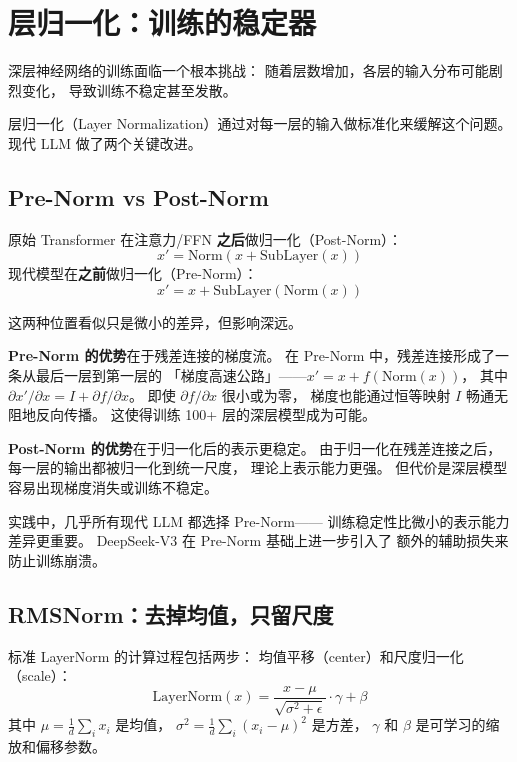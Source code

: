 \section{层归一化：训练的稳定器}

深层神经网络的训练面临一个根本挑战：
随着层数增加，各层的输入分布可能剧烈变化，
导致训练不稳定甚至发散。

层归一化（Layer Normalization）通过对每一层的输入做标准化来缓解这个问题。
现代 LLM 做了两个关键改进。

\subsection{Pre-Norm vs Post-Norm}

原始 Transformer 在注意力/FFN \textbf{之后}做归一化（Post-Norm）：
\[
  x' = \mathrm{Norm}(x + \mathrm{SubLayer}(x))
\]
现代模型在\textbf{之前}做归一化（Pre-Norm）：
\[
  x' = x + \mathrm{SubLayer}(\mathrm{Norm}(x))
\]

这两种位置看似只是微小的差异，但影响深远。

\textbf{Pre-Norm 的优势}在于残差连接的梯度流。
在 Pre-Norm 中，残差连接形成了一条从最后一层到第一层的
「梯度高速公路」——$x' = x + f(\mathrm{Norm}(x))$，
其中 $\partial x'/\partial x = I + \partial f / \partial x$。
即使 $\partial f / \partial x$ 很小或为零，
梯度也能通过恒等映射 $I$ 畅通无阻地反向传播。
这使得训练 100+ 层的深层模型成为可能。

\textbf{Post-Norm 的优势}在于归一化后的表示更稳定。
由于归一化在残差连接之后，
每一层的输出都被归一化到统一尺度，
理论上表示能力更强。
但代价是深层模型容易出现梯度消失或训练不稳定。

实践中，几乎所有现代 LLM 都选择 Pre-Norm——
训练稳定性比微小的表示能力差异更重要。
DeepSeek-V3 在 Pre-Norm 基础上进一步引入了
额外的辅助损失来防止训练崩溃。

\subsection{RMSNorm：去掉均值，只留尺度}

标准 LayerNorm 的计算过程包括两步：
均值平移（center）和尺度归一化（scale）：
\begin{equation}
  \mathrm{LayerNorm}(x) = \frac{x - \mu}{\sqrt{\sigma^2 + \epsilon}} \cdot \gamma + \beta
\end{equation}
其中 $\mu = \frac{1}{d}\sum_{i} x_i$ 是均值，
$\sigma^2 = \frac{1}{d}\sum_{i}(x_i - \mu)^2$ 是方差，
$\gamma$ 和 $\beta$ 是可学习的缩放和偏移参数。

